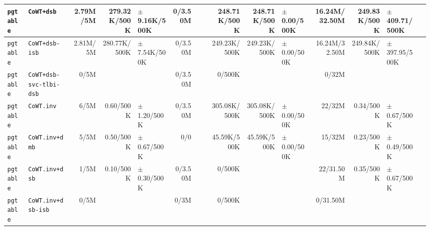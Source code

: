 \begin{tabular}{l l  | r r l | r r l | r r l | r r l l}
     \verb|pgtable| &                                            \verb|CoWT+dsb| &       2.79M/5M &          279.32K/500K &  $\pm$ 9.16K/500K &        0/3.50M &                       &                 &   248.71K/500K &          248.71K/500K &   $\pm$ 0.00/500K &  16.24M/32.50M &          249.83K/500K & $\pm$ 409.71/500K & \\ \hline 
     \verb|pgtable| &                                        \verb|CoWT+dsb-isb| &       2.81M/5M &          280.77K/500K &  $\pm$ 7.54K/500K &        0/3.50M &                       &                 &   249.23K/500K &          249.23K/500K &   $\pm$ 0.00/500K &  16.24M/32.50M &          249.84K/500K & $\pm$ 397.95/500K & \\ \hline 
     \verb|pgtable| &                               \verb|CoWT+dsb-svc-tlbi-dsb| &           0/5M &                       &                   &        0/3.50M &                       &                 &         0/500K &                       &                   &          0/32M &                       &                   & \\ \hline 
     \verb|pgtable| &                                            \verb|CoWT.inv| &           6/5M &             0.60/500K &   $\pm$ 1.20/500K &        0/3.50M &                       &                 &   305.08K/500K &          305.08K/500K &   $\pm$ 0.00/500K &         22/32M &             0.34/500K &   $\pm$ 0.67/500K & \\ \hline 
     \verb|pgtable| &                                        \verb|CoWT.inv+dmb| &           5/5M &             0.50/500K &   $\pm$ 0.67/500K &            0/0 &                       &                 &    45.59K/500K &           45.59K/500K &   $\pm$ 0.00/500K &         15/32M &             0.23/500K &   $\pm$ 0.49/500K & \\ \hline 
     \verb|pgtable| &                                        \verb|CoWT.inv+dsb| &           1/5M &             0.10/500K &   $\pm$ 0.30/500K &        0/3.50M &                       &                 &         0/500K &                       &                   &      22/31.50M &             0.35/500K &   $\pm$ 0.67/500K & \\ \hline 
     \verb|pgtable| &                                    \verb|CoWT.inv+dsb-isb| &           0/5M &                       &                   &           0/3M &                       &                 &         0/500K &                       &                   &       0/31.50M &                       &                   & \\ \hline 

\end{tabular}
